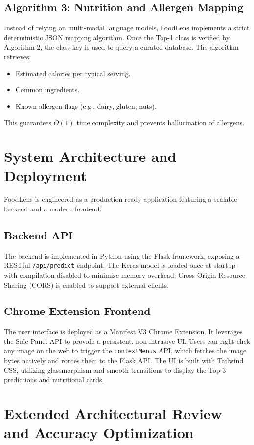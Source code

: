 \documentclass[conference]{IEEEtran}
\begin{document}
\subsection{Algorithm 3: Nutrition and Allergen Mapping}
Instead of relying on multi-modal language models, FoodLens implements a strict deterministic JSON mapping algorithm. Once the Top-1 class is verified by Algorithm 2, the class key is used to query a curated database. The algorithm retrieves:
\begin{itemize}
    \item Estimated calories per typical serving.
    \item Common ingredients.
    \item Known allergen flags (e.g., dairy, gluten, nuts).
\end{itemize}
This guarantees $O(1)$ time complexity and prevents hallucination of allergens.

\section{System Architecture and Deployment}
FoodLens is engineered as a production-ready application featuring a scalable backend and a modern frontend.

\subsection{Backend API}
The backend is implemented in Python using the Flask framework, exposing a RESTful \texttt{/api/predict} endpoint. The Keras model is loaded once at startup with compilation disabled to minimize memory overhead. Cross-Origin Resource Sharing (CORS) is enabled to support external clients.

\subsection{Chrome Extension Frontend}
The user interface is deployed as a Manifest V3 Chrome Extension. It leverages the Side Panel API to provide a persistent, non-intrusive UI. Users can right-click any image on the web to trigger the \texttt{contextMenus} API, which fetches the image bytes natively and routes them to the Flask API. The UI is built with Tailwind CSS, utilizing glassmorphism and smooth transitions to display the Top-3 predictions and nutritional cards.

\section{Extended Architectural Review and Accuracy Optimization}
\end{document}
